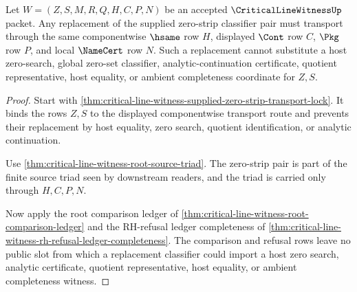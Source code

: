 \begin{theorem}
\label{thm:critical-line-witness-zero-strip-classifier-transport}
Let $W=(Z,S,M,R,Q,H,C,P,N)$ be an accepted $\CriticalLineWitnessUp$ packet. Any replacement of the supplied zero-strip classifier pair must transport through the same componentwise $\hsame$ row $H$, displayed $\Cont$ row $C$, $\Pkg$ row $P$, and local $\NameCert$ row $N$. Such a replacement cannot substitute a host zero-search, global zero-set classifier, analytic-continuation certificate, quotient representative, host equality, or ambient completeness coordinate for $Z,S$.
\end{theorem}
\begin{proof}
Start with \autoref{thm:critical-line-witness-supplied-zero-strip-transport-lock}. It binds the rows $Z,S$ to the displayed componentwise transport route and prevents their replacement by host equality, zero search, quotient identification, or analytic continuation.

Use \autoref{thm:critical-line-witness-root-source-triad}. The zero-strip pair is part of the finite source triad seen by downstream readers, and the triad is carried only through $H,C,P,N$.

Now apply the root comparison ledger of \autoref{thm:critical-line-witness-root-comparison-ledger} and the RH-refusal ledger completeness of \autoref{thm:critical-line-witness-rh-refusal-ledger-completeness}. The comparison and refusal rows leave no public slot from which a replacement classifier could import a host zero search, analytic certificate, quotient representative, host equality, or ambient completeness witness.
\end{proof}

